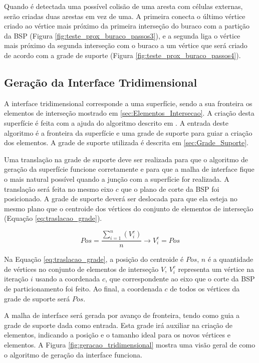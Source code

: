 Quando é detectada uma possível colisão de uma aresta com células externas, serão criadas duas arestas em vez de uma. A primeira conecta o último vértice criado ao vértice mais próximo da primeira interseção do buraco com a partição da BSP (Figura \ref{fig:teste_prox_buraco_passos3}), e a segunda liga o vértice mais próximo da segunda interseção com o buraco a um vértice que será criado de acordo com a grade de suporte (Figura \ref{fig:teste_prox_buraco_passos4}).

\subsection{Geração da Interface Tridimensional}

A interface tridimensional corresponde a uma superfície, sendo a sua fronteira os elementos de interseção mostrado em \ref{sec:Elementos_Intersecao}. A criação desta superfície é feita com a ajuda do algoritmo descrito em \cite{bib:miranda2009surface}. A entrada deste algoritmo é a fronteira da superfície e uma grade de suporte para guiar a criação dos elementos. A grade de suporte utilizada é descrita em \ref{sec:Grade_Suporte}.

Uma translação na grade de suporte deve ser realizada para que o algoritmo de geração da superfície funcione corretamente e para que a malha de interface fique o mais natural possível quando a junção com a superfície for realizada. A translação será feita no mesmo eixo $c$ que o plano de corte da BSP foi posicionado. A grade de suporte deverá ser deslocada para que ela esteja no mesmo plano que o centroide dos vértices do conjunto de elementos de interseção (Equação \ref{eq:traslacao_grade}). 

\begin{equation}
Pos = \frac{\sum_{i=1}^{n} (V_i^c)}{n} \longrightarrow V_i^c = Pos
\label{eq:traslacao_grade}
\end{equation}

Na Equação \ref{eq:traslacao_grade}, a posição do centroide é $Pos$, $n$ é a quantidade de vértices no conjunto de elementos de interseção $V$, $V_i^c$ representa um vértice na iteração $i$ usando a coordenada $c$, que correspondente ao eixo que o corte da BSP de particionamento foi feito. Ao final, a coordenada $c$ de todos os vértices da grade de suporte será $Pos$.

A malha de interface será gerada por avanço de fronteira, tendo como guia a grade de suporte dada como entrada. Esta grade irá auxiliar na criação de elementos, indicando a posição e o tamanho ideal para os novos vértices e elementos. A Figura \ref{fig:geracao_tridimensional} mostra uma visão geral de como o algoritmo de geração da interface funciona.


